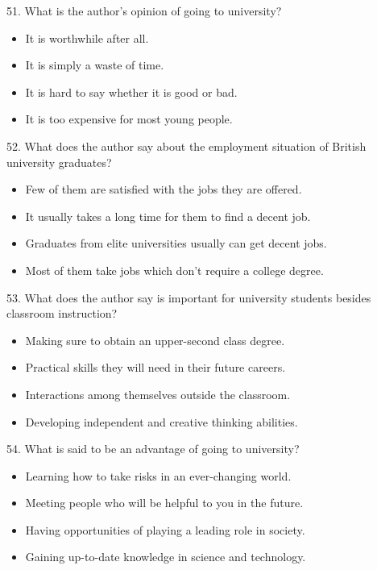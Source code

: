 \documentclass[UTF8,11pt]{ctexart}
\begin{document}
51. What is the author’s opinion of going to university?


\begin{itemize}[leftmargin=2em,itemsep=.2em,topsep=.4em]\item[A.] It is worthwhile after all.
\item[B.] It is simply a waste of time.
\item[C.] It is hard to say whether it is good or bad.
\item[D.] It is too expensive for most young people.
\end{itemize}

52. What does the author say about the employment situation of British university graduates?


\begin{itemize}[leftmargin=2em,itemsep=.2em,topsep=.4em]\item[A.] Few of them are satisfied with the jobs they are offered.
\item[B.] It usually takes a long time for them to find a decent job.
\item[C.] Graduates from elite universities usually can get decent jobs.
\item[D.] Most of them take jobs which don’t require a college degree.
\end{itemize}

53. What does the author say is important for university students besides classroom instruction?


\begin{itemize}[leftmargin=2em,itemsep=.2em,topsep=.4em]\item[A.] Making sure to obtain an upper-second class degree.
\item[B.] Practical skills they will need in their future careers.
\item[C.] Interactions among themselves outside the classroom.
\item[D.] Developing independent and creative thinking abilities.
\end{itemize}

54. What is said to be an advantage of going to university?


\begin{itemize}[leftmargin=2em,itemsep=.2em,topsep=.4em]\item[A.] Learning how to take risks in an ever-changing world.
\item[B.] Meeting people who will be helpful to you in the future.
\item[C.] Having opportunities of playing a leading role in society.
\item[D.] Gaining up-to-date knowledge in science and technology.
\end{itemize}
\end{document}
